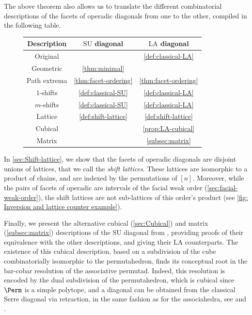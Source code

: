 \documentclass{amsart}
\theoremstyle{definition}
\newcommand{\SU}{\mathrm{SU}}
\newcommand{\LA}{\mathrm{LA}}
\begin{document}
The above theorem also allows us to translate the different combinatorial descriptions of the facets of operadic diagonals from one to the other, compiled in the following table. 

\begin{figure}[h!]
	\begin{center}
	\begin{tabular}{c|c|c}
	Description & $\SU$ diagonal & $\LA$ diagonal \\
	\hline
	Original & \cite{SaneblidzeUmble} & \cref{def:classical-LA} \\
	Geometric & \cref{thm:minimal} & \cite{LaplanteAnfossi} \\
	Path extrema & \cref{thm:facet-ordering} & \cref{thm:facet-ordering} \\
	$1$-shifts & \cref{def:classical-SU} & \cref{def:classical-LA} \\
	$m$-shifts & \cref{def:classical-SU} & \cref{def:classical-LA} \\
	Lattice & \cref{def:shift-lattice} & \cref{def:shift-lattice} \\
	Cubical & \cite{SaneblidzeUmble} & \cref{prop:LA-cubical} \\
	Matrix & \cite{SaneblidzeUmble} & \cref{subsec:matrix} 
	\end{tabular}
	\end{center}
\end{figure}

In \cref{sec:Shift-lattice}, we show that the facets of operadic diagonals are disjoint unions of lattices, that we call the \emph{shift lattices}.
These lattices are isomorphic to a product of chains, and are indexed by the permutations of $[n]$.
Moreover, while the pairs of facets of operadic are intervals of the facial weak order (\cref{sec:facial-weak-order}), the shift lattices are not sub-lattices of this order's product (see \cref{fig: Inversion and lattice counter example}). 

Finally, we present the alternative cubical (\cref{sec:Cubical}) and matrix (\cref{subsec:matrix}) descriptions of the $\SU$ diagonal from \cite{SaneblidzeUmble,SaneblidzeUmble-comparingDiagonals}, providing proofs of their equivalence with the other descriptions, and giving their $\LA$ counterparts. 
The existence of this cubical description, based on a subdivision of the cube combinatorially isomorphic to the permutahedron, finds its conceptual root in the bar-cobar resolution of the associative permutad. 
Indeed, this resolution is encoded by the dual subdivision of the permutahedron, which is cubical since $\Perm$ is a simple polytope, and a diagonal can be obtained from the classical Serre diagonal via retraction, in the same fashion as for the associahedra, see \cite{MarklShnider, Loday-diagonal} and \cite[Sec. 5.1]{LaplanteAnfossiMazuir}.
\end{document}
